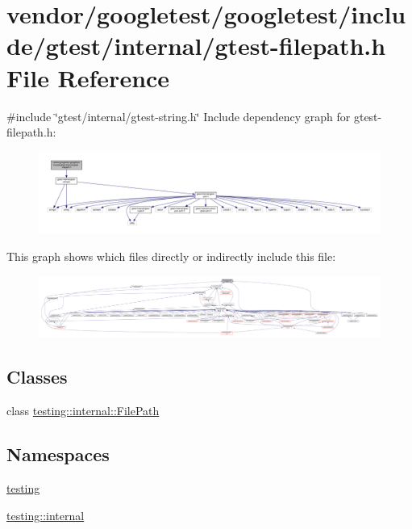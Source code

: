 \hypertarget{gtest-filepath_8h}{}\section{vendor/googletest/googletest/include/gtest/internal/gtest-\/filepath.h File Reference}
\label{gtest-filepath_8h}
{\ttfamily \#include \char`\"{}gtest/internal/gtest-\/string.\+h\char`\"{}}\newline
Include dependency graph for gtest-\/filepath.h\+:
\nopagebreak
\begin{figure}[H]
\begin{center}
\leavevmode
\includegraphics[width=350pt]{gtest-filepath_8h__incl}
\end{center}
\end{figure}
This graph shows which files directly or indirectly include this file\+:
\nopagebreak
\begin{figure}[H]
\begin{center}
\leavevmode
\includegraphics[width=350pt]{gtest-filepath_8h__dep__incl}
\end{center}
\end{figure}
\subsection*{Classes}
\begin{DoxyCompactItemize}
\item 
class \hyperlink{classtesting_1_1internal_1_1_file_path}{testing\+::internal\+::\+File\+Path}
\end{DoxyCompactItemize}
\subsection*{Namespaces}
\begin{DoxyCompactItemize}
\item 
 \hyperlink{namespacetesting}{testing}
\item 
 \hyperlink{namespacetesting_1_1internal}{testing\+::internal}
\end{DoxyCompactItemize}
